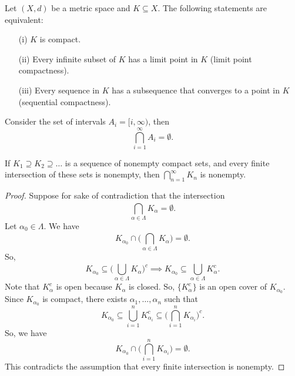 \documentclass[a4paper]{report}
\begin{document}
\begin{remark}
    Let \( (X,d) \) be a metric space and \( K \subseteq X . \) The following statements are equivalent:
    \begin{enumerate}
        \item[(i)] \( K  \) is compact.
        \item[(ii)] Every infinite subset of \( K  \) has a limit point in \( K  \) (limit point compactness).
        \item[(iii)] Every sequence in \( K  \) has a subsequence that converges to a point in \( K  \) (sequential compactness).
    \end{enumerate}
\end{remark}

\begin{eg}
    Consider the set of intervals \( {A}_{i} = [i,\infty )\), then 
    \[  \bigcap_{  i = 1  }^{ \infty   }  {A}_{i} = \emptyset. \]
\end{eg}

\begin{corollary}
If \( {K}_{1} \supseteq {K}_{2} \supseteq \dots  \) is a sequence of nonempty compact sets, and every finite intersection of these sets is nonempty, then \( \bigcap_{ n=1  }^{ \infty   }  {K }_{n} \) is nonempty.
\end{corollary}
\begin{proof}
   Suppose for sake of contradiction that the intersection 
   \[  \bigcap_{ \alpha \in \Lambda }^{  }  {K}_{\alpha} = \emptyset. \]
   Let \( {\alpha}_{0} \in \Lambda  \). We have
   \[  {K}_{{\alpha}_{0}} \cap \Big(  \bigcap_{  \alpha \in \Lambda  }^{  }  {K}_{\alpha} \Big) = \emptyset. \]
   So, 
   \[  {K}_{{\alpha}_{0}} \subseteq  \Big(  \bigcup_{ \alpha \in \Lambda  }^{  }  {K}_{\alpha} \Big)^{c} \implies {K}_{{\alpha}_{0}} \subseteq  \bigcup_{ \alpha \in \Lambda  }^{  }  {K}_{\alpha}^{c}. \]
   Note that \( {K}_{\alpha}^{c}  \) is open because \( {K}_{\alpha} \) is closed. So, \( \{ {K}_{\alpha}^{c} \}   \) is an open cover of \( {K}_{{\alpha}_{0}} \). Since \( {K}_{\alpha_0} \) is compact, there exists \( {\alpha}_{1}, \dots, {\alpha}_{n} \) such that 
   \[  {K}_{{\alpha}_{0}} \subseteq  \bigcup_{ i=1  }^{ n } {K}_{{\alpha}_{i}}^{c} \subseteq  \Big(  \bigcap_{  i=1  }^{ n }  {K}_{{\alpha}_{i}}  \Big)^{c}.   \]
   So, we have 
   \[  {K}_{{\alpha}_{0}} \cap \Big(  \bigcap_{  i =1  }^{ n }  {K}_{{\alpha}_{i}} \Big) = \emptyset. \]
   This contradicts the assumption that every finite intersection is nonempty.

\end{proof}
\end{document}
